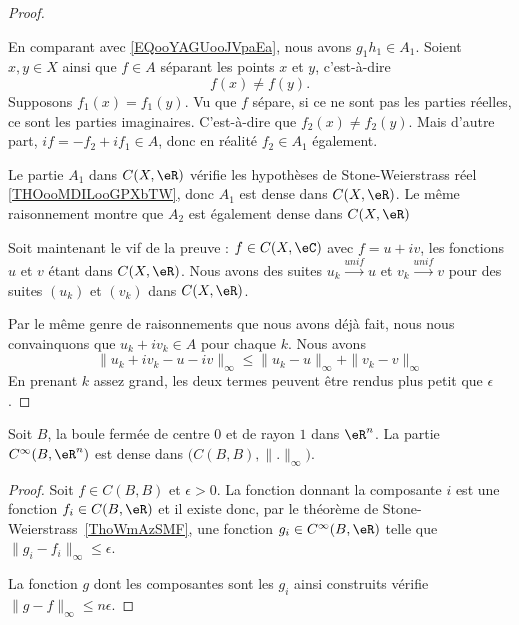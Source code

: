 \begin{proof}
\begin{subproof}
		En comparant avec \eqref{EQooYAGUooJVpaEa}, nous avons \( g_1h_1\in A_1\).
		Soient \( x,y\in X\) ainsi que \( f\in A\) séparant les points \( x\) et \( y\), c'est-à-dire
		\begin{equation}
			f(x)\neq f(y).
		\end{equation}
    Supposons \( f_1(x)=f_1(y)\). Vu que \( f\) sépare, si ce ne sont pas les parties réelles, ce sont les parties imaginaires. C'est-à-dire que  \( f_2(x)\neq f_2(y)\). Mais d'autre part, \( if=-f_2+if_1\in A\),  donc en réalité \( f_2\in A_1\) également.
	\end{subproof}
	Le partie \( A_1\) dans \( C(X,\eR)\) vérifie les hypothèses de Stone-Weierstrass réel \ref{THOooMDILooGPXbTW}, donc \( A_1\) est dense dans \( C(X,\eR)\). Le même raisonnement montre que \( A_2\) est également dense dans \( C(X,\eR)\)

	Soit maintenant le vif de la preuve : \( f\in C(X,\eC)\) avec \( f=u+iv\), les fonctions \( u\) et \( v \) étant dans \( C(X,\eR)\). Nous avons des suites \( u_{k}\stackrel{unif}{\longrightarrow}u\) et \( v_k\stackrel{unif}{\longrightarrow}v\) pour des suites \( (u_k) \) et \( (v_k)\) dans \( C(X,\eR)\).

	Par le même genre de raisonnements que nous avons déjà fait, nous nous convainquons que \( u_k+iv_k\in A\) pour chaque \( k\). Nous avons
	\begin{equation}
		\| u_k+iv_k-u-iv \|_{\infty}\leq \| u_k-u \|_{\infty}+\| v_k-v \|_{\infty}
	\end{equation}
	En prenant \( k\) assez grand, les deux termes peuvent être rendus plus petit que \( \epsilon\).
\end{proof}

\begin{corollary}        \label{CORooNIUJooLDrPSv}
	Soit \( B\), la boule fermée de centre \( 0\) et de rayon \( 1\) dans \( \eR^n\). La partie \( C^{\infty}(B,\eR^n)\) est dense dans \( \big( C(B,B),\| . \|_{\infty} \big)\).
\end{corollary}

\begin{proof}
	Soit \( f \in C(B,B)\) et \( \epsilon>0\). La fonction donnant la composante \( i\) est une fonction \( f_i\in C(B,\eR)\) et il existe donc, par le théorème de Stone-Weierstrass~\ref{ThoWmAzSMF}, une fonction \( g_i\in  C^{\infty}(B,\eR)\) telle que \( \| g_i-f_i \|_{\infty}\leq \epsilon\).

	La fonction \( g\) dont les composantes sont les \( g_i\) ainsi construits vérifie \( \| g-f \|_{\infty}\leq n\epsilon\).
\end{proof}

